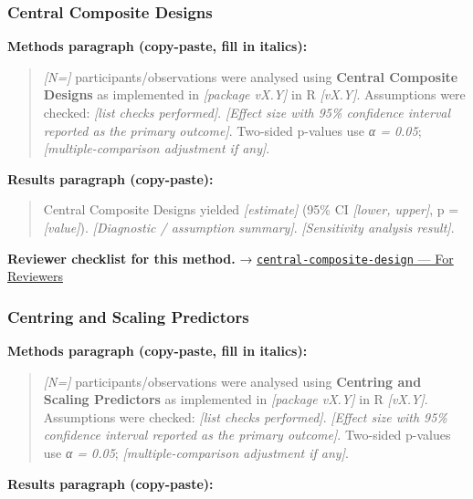 \documentclass[
]{article}
\begin{document}
\subsubsection{Central Composite
Designs}\label{central-composite-designs}

\textbf{Methods paragraph (copy-paste, fill in italics):}

\begin{quote}
\emph{{[}N={]}} participants/observations were analysed using
\textbf{Central Composite Designs} as implemented in \emph{{[}package
vX.Y{]}} in R \emph{{[}vX.Y{]}}. Assumptions were checked: \emph{{[}list
checks performed{]}}. \emph{{[}Effect size with 95\% confidence interval
reported as the primary outcome{]}}. Two-sided p-values use \emph{α =
0.05}; \emph{{[}multiple-comparison adjustment if any{]}}.
\end{quote}

\textbf{Results paragraph (copy-paste):}

\begin{quote}
Central Composite Designs yielded \emph{{[}estimate{]}} (95\% CI
\emph{{[}lower, upper{]}}, p = \emph{{[}value{]}}). \emph{{[}Diagnostic
/ assumption summary{]}}. \emph{{[}Sensitivity analysis result{]}}.
\end{quote}

\textbf{Reviewer checklist for this method.} →
\href{../chapters/16-design/central-composite-design.Rmd\#for-reviewers}{\texttt{central-composite-design}
--- For Reviewers}

\subsubsection{Centring and Scaling
Predictors}\label{centring-and-scaling-predictors}

\textbf{Methods paragraph (copy-paste, fill in italics):}

\begin{quote}
\emph{{[}N={]}} participants/observations were analysed using
\textbf{Centring and Scaling Predictors} as implemented in
\emph{{[}package vX.Y{]}} in R \emph{{[}vX.Y{]}}. Assumptions were
checked: \emph{{[}list checks performed{]}}. \emph{{[}Effect size with
95\% confidence interval reported as the primary outcome{]}}. Two-sided
p-values use \emph{α = 0.05}; \emph{{[}multiple-comparison adjustment if
any{]}}.
\end{quote}

\textbf{Results paragraph (copy-paste):}
\end{document}
